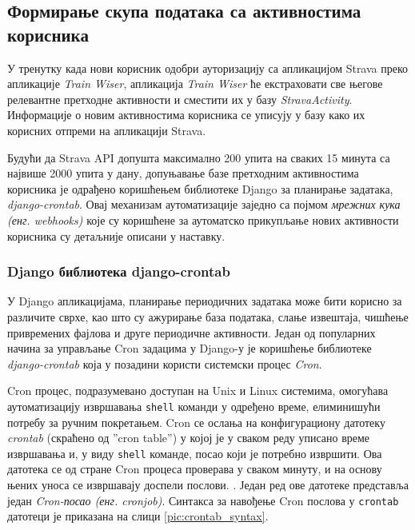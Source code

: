 \documentclass[12pt,oneside]{memoir}
\begin{document}
\subsection{Формирање скупа података са активностима корисника}


У тренутку када нови корисник одобри ауторизацију са апликацијом Strava преко апликације \textit{Train Wiser}, апликација \textit{Train Wiser} ће екстраховати све његове релевантне претходне активности и сместити их у базу \textit{StravaActivity}. Информације о новим активностима корисника се уписују у базу како их корисних отпреми на апликацији Strava.


Будући да Strava API допушта максимално 200 упита на сваких 15 минута са највише 2000 упита у дану, допуњавање базе претходним активностима корисника је одрађено коришћењем библиотеке Django за планирање задатака, \textit{django-crontab}. %
Овај механизам аутоматизације заједно са појмом \textit{мрежних кука (енг. webhooks)} које су коришћене за аутоматско прикупљање нових активности корисника су детаљније описани у наставку.

\subsubsection{Django библиотека django-crontab}

У Django апликацијама, планирање периодичних задатака може бити корисно за различите сврхе, као што су ажурирање база података, слање извештаја, чишћење привремених фајлова и друге периодичне активности. Један од популарних начина за управљање Cron задацима у Django-у је коришћење библиотеке \textit{django-crontab} \cite{django_crontab} која у позадини користи системски процес \textit{Cron}. 

Cron процес, подразумевано доступан на Unix и Linux системима, омогућава аутоматизацију извршавања \texttt{shell} команди у одређено време, елиминишући потребу за ручним покретањем. Cron се ослања на конфигурациону датотеку \textit{crontab} (скраћено од ''cron table'') у којој је у сваком реду уписано време извршавања и, у виду \texttt{shell} команде, посао који је потребно извршити. Ова датотека се од стране Cron процеса проверава у сваком минуту, и на основу њених уноса се извршавају доспели послови. \cite{linux_pocket_guide}. Један ред ове датотеке представља један \textit{Cron-посао (енг. cronjob)}. \cite{cronjob}
Синтакса за навођење Cron послова у \texttt{crontab} датотеци је приказана на слици \ref{pic:crontab_syntax}. \cite{linux_pocket_guide}
\end{document}
